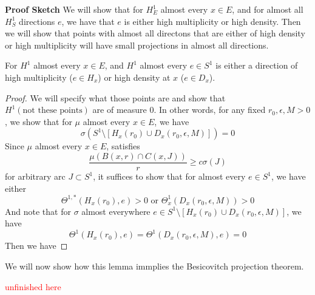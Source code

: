 \begin{note}
    \textbf{Proof Sketch} We will show that for $H^1_E$ almost every $x\in E$, and for almost all  $H^1_S$ directions $e$, we have that $e$ is either high multiplicity or high density. Then we will show that points with almost all directons that are either of high density or high multiplicity will have small projections in almost all directions.
\end{note}

\begin{lemma}
    For $H^1$ almost every $x\in E$, and $H^1$ almost every $e\in S^1$ is either a direction of high multiplicity ($e\in H_x$) or high density at $x$ ($e\in D_x$).
\end{lemma}
\begin{proof}
    We will specify what those points are and show that $H^1(\text{not these points})$ are of measure 0. In other words, for any fixed $r_0, \epsilon, M>0$, we show that for $\mu$ almost every $x\in E$, we have
    \begin{equation*}
        \sigma(S^1\setminus[H_x(r_0)\cup D_x(r_0, \epsilon, M)])=0
    \end{equation*}
    Since $\mu$ almost every $x\in E$, satisfies 
    \begin{equation*}
        \frac{\mu(B(x,r)\cap C(x,J))}{r}\geq c\sigma(J)
    \end{equation*}
    for arbitrary arc $J\subset S^1$, it suffices to show that for almost every $e\in S^1$, we have either
    \begin{equation*}
        \Theta^{1,*}(H_x(r_0), e)>0 \text{ or  } \Theta_x^1(D_x(r_0, \epsilon, M))>0
    \end{equation*}
    And note that for $\sigma$ almost  everywhere $e\in S^1\setminus [H_x(r_0)\cup D_x(r_0, \epsilon, M)]$, we have
    \begin{equation*}
        \Theta^{1}(H_x(r_0), e)=\Theta^1(D_x(r_0, \epsilon, M), e)=0
    \end{equation*}
    Then we have 
\end{proof}



We will now show how this lemma immplies the Besicovitch projection theorem.

\textcolor{red}{unfinished here}


